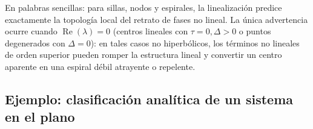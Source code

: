 En palabras sencillas: para sillas, nodos y espirales, la linealización predice exactamente la topología local del retrato de fases no lineal. La única advertencia ocurre cuando $\operatorname{Re}(\lambda) = 0$ (centros lineales con $\tau = 0, \Delta > 0$ o puntos degenerados con $\Delta = 0$): en tales casos no hiperbólicos, los términos no lineales de orden superior pueden romper la estructura lineal y convertir un centro aparente en una espiral débil atrayente o repelente.

\subsection{Ejemplo: clasificación analítica de un sistema en el plano}

